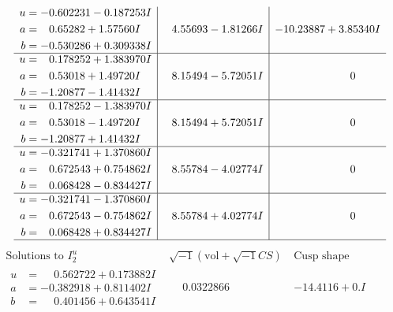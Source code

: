\documentclass[1p]{elsarticle_modified}
\theoremstyle{definition}
\newcommand{\I}{\sqrt{-1}}
\begin{document}
$$\begin{array}{c|c|c}
\begin{aligned}
u &= -0.602231 - 0.187253 I \\
a &= \phantom{-}0.65282 + 1.57560 I \\
b &= -0.530286 + 0.309338 I\end{aligned}
 & \phantom{-}4.55693 - 1.81266 I & -10.23887 + 3.85340 I \\ \hline\begin{aligned}
u &= \phantom{-}0.178252 + 1.383970 I \\
a &= \phantom{-}0.53018 + 1.49720 I \\
b &= -1.20877 - 1.41432 I\end{aligned}
 & \phantom{-}8.15494 - 5.72051 I & \phantom{-0.000000 } 0 \\ \hline\begin{aligned}
u &= \phantom{-}0.178252 - 1.383970 I \\
a &= \phantom{-}0.53018 - 1.49720 I \\
b &= -1.20877 + 1.41432 I\end{aligned}
 & \phantom{-}8.15494 + 5.72051 I & \phantom{-0.000000 } 0 \\ \hline\begin{aligned}
u &= -0.321741 + 1.370860 I \\
a &= \phantom{-}0.672543 + 0.754862 I \\
b &= \phantom{-}0.068428 - 0.834427 I\end{aligned}
 & \phantom{-}8.55784 - 4.02774 I & \phantom{-0.000000 } 0 \\ \hline\begin{aligned}
u &= -0.321741 - 1.370860 I \\
a &= \phantom{-}0.672543 - 0.754862 I \\
b &= \phantom{-}0.068428 + 0.834427 I\end{aligned}
 & \phantom{-}8.55784 + 4.02774 I & \phantom{-0.000000 } 0\\
 \hline 
 \end{array}$$\newpage$$\begin{array}{c|c|c}  
\text{Solutions to }I^u_{2}& \I (\text{vol} + \sqrt{-1}CS) & \text{Cusp shape}\\
 \hline 
\begin{aligned}
u &= \phantom{-}0.562722 + 0.173882 I \\
a &= -0.382918 + 0.811402 I \\
b &= \phantom{-}0.401456 + 0.643541 I\end{aligned}
 & \phantom{-}0.0322866\phantom{ +0.000000I} & -14.4116 + 0. I\phantom{ +0.000000I} \\ \hline\begin{aligned}

\end{aligned}
\end{array}$$
\end{document}
